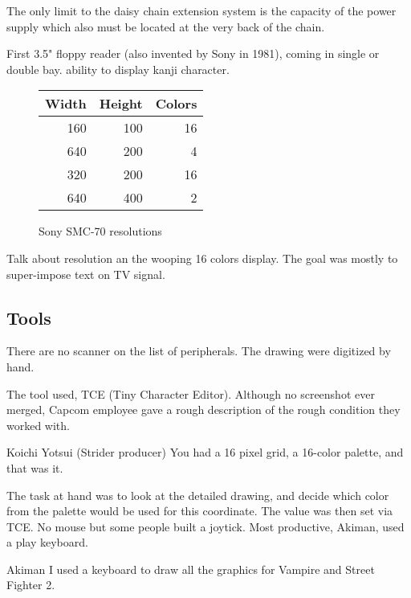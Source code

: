 % 


The only limit to the daisy chain extension system is the capacity of the power supply which also must be located at the very back of the chain. 

First 3.5" floppy reader (also invented by Sony in 1981), coming in single or double bay. ability to display kanji character.

 \begin{figure}[H]
 \center
\begin{tabularx}{0.35\textwidth}{rrr} 
  \textbf{Width} & \textbf{Height} & \textbf{Colors} \\               
  \toprule    
160& 100& 16 \\
640& 200& 4 \\
320& 200& 16 \\
640& 400& 2 \\
\toprule
\end{tabularx}%
\caption*{Sony SMC-70 resolutions}
\end{figure}

Talk about resolution an the wooping 16 colors display. The goal was mostly to super-impose text on TV signal.


\subsection{Tools}

There are no scanner on the list of peripherals. The drawing were digitized by hand.

The tool used, TCE (Tiny Character Editor). Although no screenshot ever merged, Capcom employee gave a rough description of the rough condition they worked with.

\begin{q}{Koichi Yotsui (Strider producer)}
You had a 16 pixel grid, a 16-color palette, and that was it.
\end{q}

The task at hand was to look at the detailed drawing, and decide which color from the palette would be used for this coordinate. The value was then set via TCE. No mouse but some people built a joytick. Most productive, Akiman, used a play keyboard.

\begin{q}{Akiman\cite{akiman}}
I used a keyboard to draw all the graphics for Vampire and Street Fighter 2.
\end{q}




